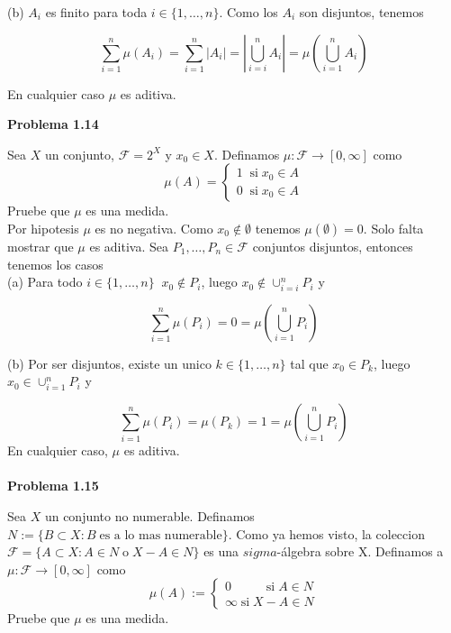 \documentclass[12pt]{article}
\begin{document}
    (b) $A_i$ es finito para toda $i\in \{1,\ldots,n\}$. Como los $A_i$ son disjuntos, tenemos

    \[\sum_{i=1}^n \mu(A_i) = \sum_{i=1}^n |A_i| = \left|\bigcup_{i=i}^nA_i\right| = \mu \left(\bigcup_{i=1}^n A_i\right)\]

    \noindent En cualquier caso $\mu$ es aditiva.
    \newpage

    \textbf{Problema 1.14}

    Sea $X$ un conjunto, $\mathcal{F} = 2^X$ y $x_0\in X$. Definamos 
    $\mu:\mathcal{F}\rightarrow [0,\infty]$ como 
    \begin{equation*}
        \mu (A) = \left\{
        \begin{aligned}
            1\;\; \text{si}\; x_0\in A \\
            0\;\; \text{si}\; x_0\in A
        \end{aligned}
        \right.
    \end{equation*}    
    Pruebe que $\mu$ es una medida.
    \\

    Por hipotesis $\mu$ es no negativa. Como $x_0 \notin \emptyset$ tenemos 
    $\mu(\emptyset) = 0$. Solo falta mostrar que $\mu$ es aditiva. Sea 
    $P_1,\ldots,P_n\in \mathcal{F}$ conjuntos disjuntos, entonces tenemos los casos
    \\

    (a) Para todo $i\in \{1,\ldots,n\}\;\; x_0\notin P_i$, luego 
    $x_0 \notin \cup_{i=i}^n P_i$ y 

    \[\sum_{i=1}^n \mu(P_i) = 0 = \mu \left(\bigcup_{i=1}^n P_i\right)\]

    (b) Por ser disjuntos, existe un unico $k\in \{1,\ldots,n\}$ tal que $x_0 \in P_k$, luego
    $x_0 \in \cup_{i=1}^n P_i$ y 

    \[\sum_{i=1}^n \mu(P_i) = \mu(P_k) = 1 = \mu\left(\bigcup_{i=1}^n P_i\right)\]
    En cualquier caso, $\mu$ es aditiva.
    \\ \\

    \textbf{Problema 1.15}

    Sea $X$ un conjunto no numerable. Definamos 
    $N := \{B\subset X : B\; \text{es a lo mas numerable}\}$. Como ya hemos visto, la 
    coleccion $\mathcal{F} = \{A\subset X : A\in N\; \text{o}\; X-A\in N\}$ es una 
    $sigma$-\'algebra sobre X. Definamos a $\mu:\mathcal{F} \rightarrow [0,\infty]$ como 
    \begin{equation*}
        \mu (A) := \left\{ 
        \begin{aligned}
            0 \;\;\;\;\;\;\;\;\;\;\text{si}\; A\in N \\
            \infty \; \text{si}\; X-A\in N
        \end{aligned}
        \right.
    \end{equation*}
    Pruebe que $\mu$ es una medida.
    \\
\end{document}
